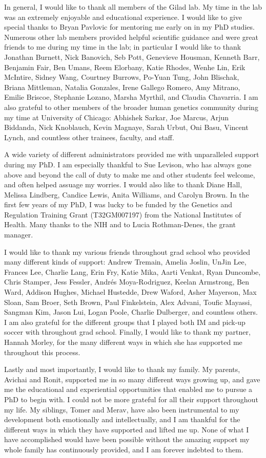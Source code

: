In general, I would like to thank all members of the Gilad lab. My time in the lab was an extremely enjoyable and educational experience. I would like to give special thanks to Bryan Pavlovic for mentoring me early on in my PhD studies. Numerous other lab members provided helpful scientific guidance and were great friends to me during my time in the lab; in particular I would like to thank Jonathan Burnett, Nick Banovich, Seb Pott, Genevieve Housman, Kenneth Barr, Benjamin Fair, Ben Umans, Reem Elorbany, Katie Rhodes, Wenhe Lin, Erik McIntire, Sidney Wang, Courtney Burrows, Po-Yuan Tung, John Blischak, Briana Mittleman, Natalia Gonzales, Irene Gallego Romero, Amy Mitrano, Emilie Briscoe, Stephanie Lozano, Marsha Myrthil, and Claudia Chavarria. I am also grateful to other members of the broader human genetics community during my time at University of Chicago:  Abhishek Sarkar, Joe Marcus, Arjun Biddanda, Nick Knoblauch, Kevin Magnaye, Sarah Urbut, Oni Basu, Vincent Lynch, and countless other trainees, faculty, and staff.

A wide variety of different administrators provided me with unparalleled support during my PhD. I am especially thankful to Sue Levison, who has always gone above and beyond the call of duty to make me and other students feel welcome, and often helped assuage my worries. I would also like to thank Diane Hall, Melissa Lindberg, Candice Lewis, Anita Williams, and Carolyn Brown. In the first few years of my PhD, I was lucky to be funded by the Genetics and Regulation Training Grant (T32GM007197) from the National Institutes of Health. Many thanks to the NIH and to Lucia Rothman-Denes, the grant manager.

I would like to thank my various friends throughout grad school who provided many different kinds of support: Andrew Tremain, Amelia Joslin, UnJin Lee, Frances Lee, Charlie Lang, Erin Fry, Katie Mika, Aarti Venkat, Ryan Duncombe, Chris Stamper, Jess Fessler, Andr\'es Moya-Rodriguez, Keelan Armstrong, Ben Ward, Addison Hughes, Michael Hustedde, Drew Waford, Asher Mayerson, Max Sloan, Sam Broer, Seth Brown, Paul Finkelstein, Alex Advani, Toufic Mayassi, Sangman Kim, Jason Lui, Logan Poole, Charlie Dulberger, and countless others. I am also grateful for the different groups that I played both IM and pick-up soccer with throughout grad school. Finally, I would like to thank my partner, Hannah Morley, for the many different ways in which she has supported me throughout this process.

Lastly and most importantly, I would like to thank my family. My parents, Avichai and Ronit, supported me in so many different ways growing up, and gave me the educational and experiential opportunities that enabled me to pursue a PhD to begin with. I could not be more grateful for all their support throughout my life. My siblings, Tomer and Merav, have also been instrumental to my development both emotionally and intellectually, and I am thankful for the different ways in which they have supported and lifted me up. None of what I have accomplished would have been possible without the amazing support my whole family has continuously provided, and I am forever indebted to them.